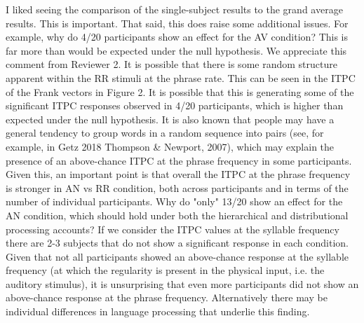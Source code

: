 \documentclass[10pt,letterpaper]{article}
\begin{document}
\color{black}
\newline
\noindent
I liked seeing the comparison of the single-subject results to the grand average results. This is important. That said, this does raise some additional issues. For example, why do 4/20 participants show an effect for the AV condition? This is far more than would be expected under the null hypothesis.
\color{blue}
We appreciate this comment from Reviewer 2. It is possible that there is some random structure apparent within the RR stimuli at the phrase rate. This can be seen in the ITPC of the Frank vectors in Figure 2. It is possible that this is generating some of the significant ITPC responses observed in 4/20 participants, which is higher than expected under the null hypothesis.
It is also known that people may have a general tendency to group words in a random sequence into pairs (see, for example, in Getz 2018 Thompson & Newport, 2007), which may explain the presence of an above-chance ITPC at the phrase frequency in some participants.  Given this, an important point is that overall the ITPC at the phrase frequency is stronger in AN vs RR condition, both across participants and in terms of the number of individual participants.
\color{black}
\newline
\noindent
Why do "only" 13/20 show an effect for the AN condition, which should hold under both the hierarchical and distributional processing accounts?
\color{blue}
If we consider the ITPC values at the syllable frequency there are 2-3 subjects that do not show a significant response in each condition. Given that not all participants showed an above-chance response at the syllable frequency (at which the regularity is present in the physical input, i.e. the auditory stimulus), it is unsurprising that even more participants did not show an above-chance response at the phrase frequency. Alternatively there may be individual differences in language processing that underlie this finding.
\end{document}
